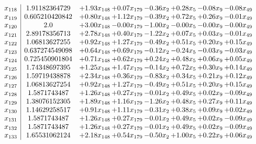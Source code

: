 \documentclass[8pt]{article}
\begin{document}
\[\begin{array}{c| c c@{\hskip 2pt} c@{\hskip 2pt} c@{\hskip 2pt} c@{\hskip 2pt} c@{\hskip 2pt} c@{\hskip 2pt} }
 x_{118}   &  1.91182364729 & +  1.93 x_{148} & +  0.07 x_{179} & -0.36 x_{2} & +  0.28 x_{5} & -0.08 x_{9} & -0.08 x_{49}\\
 x_{119}   &  0.605210420842 & +  0.80 x_{148} & +  1.12 x_{179} & -0.39 x_{2} & +  0.72 x_{5} & +  0.26 x_{9} & -0.01 x_{49}\\
 x_{120}   &  2.0 & +  3.00 x_{148} & -0.00 x_{179} & -1.00 x_{2} & -0.00 x_{5} & -0.00 x_{9} & -0.00 x_{49}\\
 x_{121}   &  2.89178356713 & +  2.78 x_{148} & +  0.40 x_{179} & -1.22 x_{2} & +  0.07 x_{5} & +  0.03 x_{9} & -0.01 x_{49}\\
 x_{122}   &  1.06813627255 & +  0.92 x_{148} & +  1.27 x_{179} & -0.49 x_{2} & +  0.51 x_{5} & +  0.20 x_{9} & +  0.15 x_{49}\\
 x_{123}   &  0.637274549098 & +  0.64 x_{148} & +  0.69 x_{179} & -0.12 x_{2} & -0.24 x_{5} & -0.03 x_{9} & -0.03 x_{49}\\
 x_{124}   &  0.725450901804 & +  0.71 x_{148} & +  0.62 x_{179} & +  0.24 x_{2} & +  0.48 x_{5} & +  0.06 x_{9} & +  0.05 x_{49}\\
 x_{125}   &  1.74348697395 & +  1.25 x_{148} & +  1.47 x_{179} & -0.14 x_{2} & +  0.72 x_{5} & +  0.30 x_{9} & +  0.14 x_{49}\\
 x_{126}   &  1.59719438878 & +  2.34 x_{148} & +  0.36 x_{179} & -0.83 x_{2} & +  0.34 x_{5} & +  0.21 x_{9} & +  0.12 x_{49}\\
 x_{127}   &  1.06813627254 & +  0.92 x_{148} & +  1.27 x_{179} & -0.49 x_{2} & +  0.51 x_{5} & +  0.20 x_{9} & +  0.15 x_{49}\\
 x_{128}   &  1.5871743487 & +  1.26 x_{148} & +  0.27 x_{179} & -0.01 x_{2} & +  0.49 x_{5} & +  0.02 x_{9} & -0.09 x_{49}\\
 x_{129}   &  1.38076152305 & +  1.89 x_{148} & +  1.16 x_{179} & -1.26 x_{2} & +  0.48 x_{5} & +  0.27 x_{9} & +  0.11 x_{49}\\
 x_{130}   &  1.14629258517 & +  0.91 x_{148} & +  1.11 x_{179} & -0.31 x_{2} & +  0.38 x_{5} & +  0.09 x_{9} & +  0.02 x_{49}\\
 x_{131}   &  1.5871743487 & +  1.26 x_{148} & +  0.27 x_{179} & -0.01 x_{2} & +  0.49 x_{5} & +  0.02 x_{9} & -0.09 x_{49}\\
 x_{132}   &  1.5871743487 & +  1.26 x_{148} & +  0.27 x_{179} & -0.01 x_{2} & +  0.49 x_{5} & +  0.02 x_{9} & -0.09 x_{49}\\
 x_{133}   &  1.65531062124 & +  2.18 x_{148} & +  0.54 x_{179} & -0.50 x_{2} & +  1.00 x_{5} & +  0.22 x_{9} & +  0.06 x_{49}\\

\end{array}\]
\end{document}
